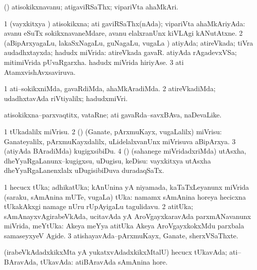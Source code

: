 \bentry
{}
\gl{\nA}
\bmng
(\pArxparx) atisokikxnavanu; atigaviRSaThx; vipariVta ahaMkAri. 
\emng
\eentry

\bentry
{}
\gl{\gu}
\bmng
\bnum
\num{1} (vayxkitxya \vi) atisokikxna; ati gaviRSaThx(nAda); vipariVta ahaMkAriyAda:  avanu eSuTx sokikxnavaneMdare, avanu elalxranUnx kiVLAgi kANutAtxne. 
\num{2} (aBipArxyagaLu, lakaSxNagaLu, guNagaLu, \mo vugaLa \vi) atiyAda; atireVkada; tiVra audadhxtayxda; hadudx miVrida:  atireVkada gavaR.  atiyAda rAgadevxVSa; mitimiVrida pUvaRgarxha.  hadudx miVrida hiriyAse. 
\num{3} ati AtamxvishAvxsaviruva. 
\enum
\emng
\eentry

\bentry
{}
\gl{\kirxvi}
\bmng
\bnum
\num{1} ati--sokikxniMda, gavaRdiMda, ahaMkAradiMda. 
\num{2} atireVkadiMda; udadhxtavAda riVtiyalilx; hadudxmiVri. 
\enum
\emng
\eentry

\bentry
{}
\gl{\nA}
\bmng
atisokikxna--parxvaqtitx, vataRne; ati gavaRda--savxBAva, naDevaLike. 
\emng
\eentry

\bentry
{}
\gl{\sakirx}
\bmng
\bnum
\num{1} tUkadalilx miVrisu. 
\num{2} (\rUpa) (Ganate, pArxmuKayx, \mo vugaLalilx) miVrisu:  Ganateyalilx, pArxmuKayxdalilx, uLidelalxvanUnx miVrisuva aBipArxya. 
\num{3} (atiyAda BAradiMda) kugigxsibiDu. 
\num{4} (\rUpa) (sahanege miVridadxriMda) utAsxha, dheYyaRgaLanunx--kugigxsu, uDugisu, keDisu:  vayxkitxya utAsxha dheYyaRgaLanenxlalx uDugisibiDuva duradaqSaTx. 
\enum
\emng
\eentry

\bentry
{}
\gl{\nA}
\bmng
\bnum
\num{1} hecucx tUka; adhikatUka; kAnUnina yA niyamada, kaTaTxLeyanunx miVrida (saraku, sAmAnina mUTe, \mo vugaLa) tUka:  namamx sAmAnina horeya hecicxna tUkakAkxgi namage nUru rUpAyigaLu tagulidavu. 
\num{2} atitUka; sAmAnayxvAgirabeVkAda, ucitavAda yA AroVgayxkaravAda parxmANavanunx miVrida, meYtUka:  Akeya meYya atitUka Akeya AroVgayxkokxMdu parxbala samaseyxyeV Agide. 
\num{3} atishayavAda--pArxmuKayx, Ganate, sherxVSaThxte. 
\enum
\emng
\eentry

\bentry
{}
\gl{\gu}
\bmng
(irabeVkAdadxkikxMta yA yukatxvAdadxkikxMtalU) hecucx tUkavAda; ati--BAravAda, tUkavAda:  atiBAravAda sAmAnina hore. 
\emng
\eentry

